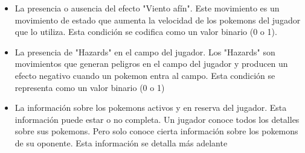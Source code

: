 \begin{itemize}
\begin{itemize}
        \item La presencia o ausencia del efecto "Viento afín". Este movimiento es un movimiento de estado que aumenta la velocidad de los pokemons del jugador que lo utiliza. Esta condición se codifica como un valor binario (0 o 1).
        \item La presencia de "Hazards" en el campo del jugador. Los "Hazards" son movimientos que generan peligros en el campo del jugador y producen un efecto negativo cuando un pokemon entra al campo. Esta condición se representa como un valor binario (0 o 1)
        \item La información sobre los pokemons activos y en reserva del jugador. Esta información puede estar o no completa. Un jugador conoce todos los detalles sobre sus pokemons. Pero solo conoce cierta información sobre los pokemons de su oponente. Esta información se detalla más adelante
\end{itemize}


\end{itemize}
